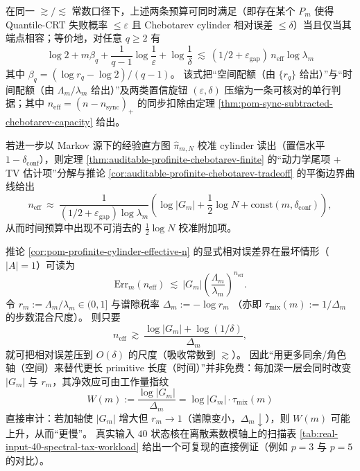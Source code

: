 \begin{remark}\label{rem:pom-space-time-confidence-law}
在同一 \(\gtrsim/\lesssim\) 常数口径下，上述两条预算可同时满足（即存在某个 \(P_m\) 使得 Quantile-CRT 失败概率 \(\le\varepsilon\) 且 Chebotarev cylinder 相对误差 \(\le\delta\)）当且仅当其端点相容；等价地，对任意 \(q\ge 2\) 有
\[
\boxed{
\log 2+m\beta_q+\frac{1}{q-1}\log\frac{1}{\varepsilon}+\log\frac{1}{\delta}
\ \lesssim\
(1/2+\varepsilon_{\mathrm{gap}})\,n_{\mathrm{eff}}\log\lambda_m
}
\]
其中 \(\beta_q=(\log r_q-\log 2)/(q-1)\)。
该式把“空间配额（由 \(\{r_q\}\) 给出）”与“时间配额（由 \(\Lambda_m/\lambda_m\) 给出）”及两类置信旋钮 \((\varepsilon,\delta)\) 压缩为一条可核对的单行判据；其中 \(n_{\mathrm{eff}}=(n-n_{\mathrm{sync}})_+\) 的同步扣除由定理 \ref{thm:pom-sync-subtracted-chebotarev-capacity} 给出。
\par
若进一步以 Markov 源下的经验直方图 \(\hat{\pi}_{m,N}\) 校准 cylinder 读出（置信水平 \(1-\delta_{\mathrm{conf}}\)），则定理 \ref{thm:auditable-profinite-chebotarev-finite} 的“动力学尾项 + TV 估计项”分解与推论 \ref{cor:auditable-profinite-chebotarev-tradeoff} 的平衡边界曲线给出
\[
n_{\mathrm{eff}}\ \approx\
\frac{1}{(1/2+\varepsilon_{\mathrm{gap}})\log\lambda_m}\left(\log|G_m|+\frac12\log N+\mathrm{const}(m,\delta_{\mathrm{conf}})\right),
\]
从而时间预算中出现不可消去的 \(\tfrac12\log N\) 校准附加项。
\end{remark}

\begin{remark}\label{rem:pom-spectral-tax-workload}
推论 \ref{cor:pom-profinite-cylinder-effective-n} 的显式相对误差界在最坏情形（\(|A|=1\)）可读为
\[
\mathrm{Err}_m(n_{\mathrm{eff}})\ \lesssim\ |G_m|\left(\frac{\Lambda_m}{\lambda_m}\right)^{n_{\mathrm{eff}}}.
\]
令
\(
r_m:=\Lambda_m/\lambda_m\in(0,1]
\)
与谱隙税率
\(
\Delta_m:=-\log r_m
\)
（亦即 \(\tau_{\mathrm{mix}}(m):=1/\Delta_m\) 的步数混合尺度）。
则只要
\[
n_{\mathrm{eff}}\ \gtrsim\ \frac{\log|G_m|+\log(1/\delta)}{\Delta_m},
\]
就可把相对误差压到 \(O(\delta)\) 的尺度（吸收常数到 \(\gtrsim\)）。
因此“用更多同余/角色轴（空间）来替代更长 primitive 长度（时间）”并非免费：每加深一层会同时改变
\(|G_m|\) 与 \(r_m\)，其净效应可由工作量指纹
\[
W(m):=\frac{\log|G_m|}{\Delta_m}=\log|G_m|\cdot\tau_{\mathrm{mix}}(m)
\]
直接审计：若加轴使 \(|G_m|\) 增大但 \(r_m\to 1\)（谱隙变小，\(\Delta_m\downarrow\)），则 \(W(m)\) 可能上升，从而“更慢”。
真实输入 \(40\) 状态核在离散素数模轴上的扫描表 \ref{tab:real-input-40-spectral-tax-workload} 给出一个可复现的直接例证（例如 \(p=3\) 与 \(p=5\) 的对比）。
\end{remark}


